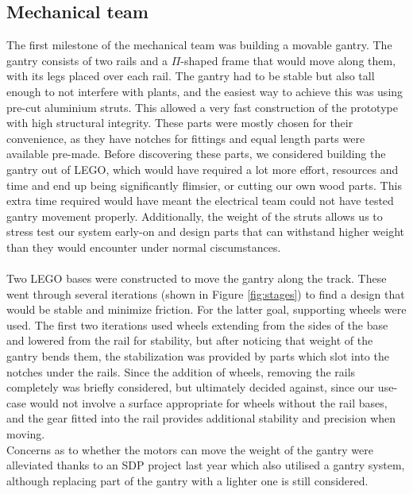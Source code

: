 \documentclass{article}
\begin{document}
\subsection{Mechanical team}
The first milestone of the mechanical team was building a movable gantry. The gantry consists of two rails and a \(\Pi\)-shaped frame that would move along them, with its legs placed over each rail. 
The gantry had to be stable but also tall enough to not interfere with plants, and the easiest way to achieve this was using pre-cut aluminium struts. This allowed a very fast construction of the prototype with high structural integrity. These parts were mostly chosen for their convenience, as they have notches for fittings and equal length parts were available pre-made. Before discovering these parts, we considered building the gantry out of LEGO, which would have required a lot more effort, resources and time and end up being significantly flimsier, or cutting our own wood parts. This extra time required would have meant the electrical team could not have tested gantry movement properly. Additionally, the weight of the struts allows us to stress test our system early-on and design parts that can withstand higher weight than they would encounter under normal ciscumstances.
\\ \\
Two LEGO bases were constructed to move the gantry along the track. These went through several iterations (shown in Figure \ref{fig:stages}) to find a design that would be stable and minimize friction. For the latter goal, supporting wheels were used. The first two iterations used wheels extending from the sides of the base and lowered from the rail for stability, but after noticing that weight of the gantry bends them, the stabilization was provided by parts which slot into the notches under the rails. Since the addition of wheels, removing the rails completely was briefly considered, but ultimately decided against, since our use-case would not involve a surface appropriate for wheels without the rail bases, and the gear fitted into the rail provides additional stability and precision when moving. \\ Concerns as to whether the motors can move the weight of the gantry were alleviated thanks to an SDP project last year which also utilised a gantry system, although replacing part of the gantry with a lighter one is still considered.
\\ \\
\end{document}
